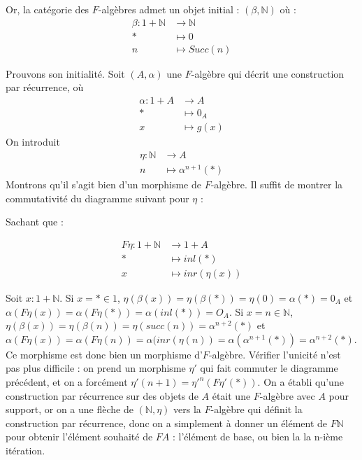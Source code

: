 \documentclass{article}
\newcommand{\N}{\mathbb{N}}
\begin{document}
Or, la catégorie des $F$-algèbres admet un objet initial : $(\beta, \N)$ où : 
\begin{align*}
\beta : 1 + \N & \rightarrow \N \\
        * & \mapsto 0 \\ 
        n & \mapsto Succ(n)
\end{align*}

Prouvons son initialité. Soit $(A, \alpha)$ une $F$-algèbre qui décrit une construction par récurrence, où 
\begin{align*}
    \alpha : 1 + A & \rightarrow A \\ 
    * & \mapsto 0_A \\ 
    x & \mapsto g(x)
\end{align*}
On introduit
\begin{align*}
    \eta : \N & \rightarrow  A \\ 
    n & \mapsto \alpha^{n+1}(*)    
\end{align*} 
Montrons qu'il s'agit bien d'un morphisme de $F$-algèbre. Il suffit de montrer la commutativité du diagramme suivant pour $\eta$ : 
\begin{center}
\end{center}

Sachant que :

\begin{align*}
    F \eta : 1 + \N & \rightarrow 1 + A \\ 
        * & \mapsto inl(*) \\ 
        x & \mapsto inr(\eta(x))  
\end{align*}

Soit $x : 1 + \N$. Si $x = * \in 1$, $ \eta(\beta(x)) = \eta(\beta(*)) = \eta(0) = \alpha(*) = 0_A $ et $ \alpha(F \eta (x)) = \alpha( F \eta (*)) = \alpha(inl(*)) = O_A $. Si $x = n \in \N$, $ \eta(\beta(x)) = \eta(\beta(n)) = \eta(succ(n)) = \alpha^{n+2}(*) $ et $ \alpha( F \eta (x)) = \alpha(F \eta (n)) = \alpha(inr(\eta(n)) = \alpha(\alpha^{n+1}(*)) = \alpha^{n+2}(*) $. Ce morphisme est donc bien un morphisme d'$F$-algèbre. Vérifier l'unicité n'est pas plus difficile : on prend un morphisme $\eta'$ qui fait commuter le diagramme précédent, et on a forcément $\eta'(n+1) = \eta'^n(F\eta'(*)) $. On a établi qu'une construction par récurrence sur des objets de $A$ était une $F$-algèbre avec $A$ pour support, or on a une flèche de $(\N, \eta)$ vers la $F$-algèbre qui définit la construction par récurrence, donc on a simplement à donner un élément de $F\N$ pour obtenir l'élément souhaité de $FA$ : l'élément de base, ou bien la la n-ième itération. 
\end{document}

